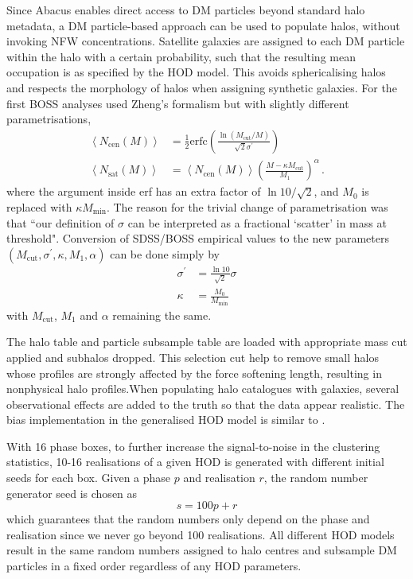 \documentclass[fleqn,usenatbib]{mnras}
\begin{document}
			Since Abacus enables direct access to DM particles beyond standard halo metadata, a DM particle-based approach can be used to populate halos, without invoking NFW concentrations. Satellite galaxies are assigned to each DM particle within the halo with a certain probability, such that the resulting mean occupation is as specified by the HOD model. This avoids sphericalising halos and respects the morphology of halos when assigning synthetic galaxies. For the first BOSS analyses \cite{white11} used Zheng's formalism but with slightly different parametrisations,
			\begin{align}
				\left< N_\text{cen} (M) \right> &= \frac{1}{2} \mathrm{erfc} \left( \frac{\ln(M_\text{cut} / M)}{\sqrt{2} \sigma^\prime} \right) \\
				\left< N_\text{sat} (M) \right> &= \left< N_\text{cen} (M) \right> \left( \frac{M - \kappa M _\text{cut} }{M_1} \right) ^\alpha \, .
			\end{align}
			where the argument inside erf has an extra factor of $\ln 10 / \sqrt{2}$, and $M_0$ is replaced with $\kappa M_\text{min}$. The reason for the trivial change of parametrisation was that ``our definition of $\sigma$ can be interpreted as a fractional `scatter' in mass at threshold". Conversion of SDSS/BOSS empirical values to the new parameters $(M_\text{cut}, \sigma^\prime, \kappa, M_1, \alpha)$  can be done simply by
			\begin{align}
				\sigma ^\prime &= \frac{\ln 10}{\sqrt{2}} \sigma \\
				\kappa &= \frac{M_0}{M_\text{min}}
			\end{align}
			with $M_\text{cut}$, $M_1$ and $\alpha$ remaining the same.
			
			The halo table and particle subsample table are loaded with appropriate mass cut applied and subhalos dropped. This selection cut help to remove small halos whose profiles are strongly
			affected by the force softening length, resulting in nonphysical halo profiles.When populating halo catalogues with galaxies, several observational effects are added to the truth so that the data appear realistic. The bias implementation in the generalised HOD model is similar to \cite{yuan2018}.
			
			With 16 phase boxes, to further increase the signal-to-noise in the clustering statistics, 10-16 realisations of a given HOD is generated with different initial seeds for each box. Given a phase $p$ and realisation $r$, the random number generator seed is chosen as
			\begin{equation}
				s = 100p + r
			\end{equation}
			which guarantees that the random numbers only depend on the phase and realisation since we never go beyond 100 realisations. All different HOD models result in the same random numbers assigned to halo centres and subsample DM particles in a fixed order regardless of any HOD parameters. 
\end{document}

